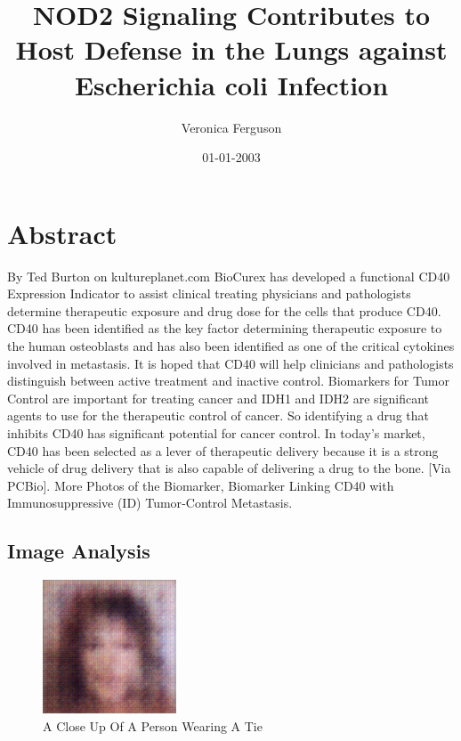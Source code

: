 \documentclass{article}%
\title{NOD2 Signaling Contributes to Host Defense in the Lungs against Escherichia coli Infection}%
\author{Veronica Ferguson}%
\affil{Blood Transfusion Centre of Slovenia, Ljubljana, Slovenia}%
\date{01{-}01{-}2003}%
\begin{document}
%
\normalsize%
\maketitle%
\section{Abstract}%
\label{sec:Abstract}%
By Ted Burton on kultureplanet.com\newline%
BioCurex has developed a functional CD40 Expression Indicator to assist clinical treating physicians and pathologists determine therapeutic exposure and drug dose for the cells that produce CD40. CD40 has been identified as the key factor determining therapeutic exposure to the human osteoblasts and has also been identified as one of the critical cytokines involved in metastasis. It is hoped that CD40 will help clinicians and pathologists distinguish between active treatment and inactive control. Biomarkers for Tumor Control are important for treating cancer and IDH1 and IDH2 are significant agents to use for the therapeutic control of cancer. So identifying a drug that inhibits CD40 has significant potential for cancer control. In today's market, CD40 has been selected as a lever of therapeutic delivery because it is a strong vehicle of drug delivery that is also capable of delivering a drug to the bone.\newline%
{[}Via PCBio{]}. More Photos of the Biomarker, Biomarker Linking CD40 with Immunosuppressive (ID) Tumor{-}Control Metastasis.

%
\subsection{Image Analysis}%
\label{subsec:ImageAnalysis}%


\begin{figure}[h!]%
\centering%
\includegraphics[width=150px]{500_fake_images/samples_5_342.png}%
\caption{A Close Up Of A Person Wearing A Tie}%
\end{figure}

%
\end{document}
